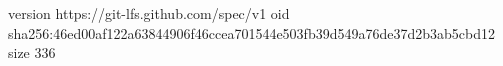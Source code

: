 version https://git-lfs.github.com/spec/v1
oid sha256:46ed00af122a63844906f46ccea701544e503fb39d549a76de37d2b3ab5cbd12
size 336
